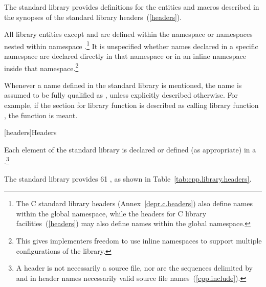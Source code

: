 \pnum
The \Cpp standard library provides definitions
for the entities and macros described in the synopses
of the \Cpp standard library headers~(\ref{headers}).

\pnum
All library entities except
and
are defined within the namespace
or namespaces nested within namespace
.\footnote{The C standard library headers (Annex~\ref{depr.c.headers}) also define
names within the global namespace, while the \Cpp headers for C library
facilities~(\ref{headers}) may also define names within the global namespace.}%
It is unspecified whether names declared in a specific namespace are declared
directly in that namespace or in an inline namespace inside that
namespace.\footnote{This gives implementers freedom to use inline namespaces to
support multiple configurations of the library.}

\pnum
Whenever a name  defined in the standard library is mentioned,
the name  is assumed to be fully qualified as
,
unless explicitly described otherwise. For example, if the \effects section
for library function  is described as calling library function ,
the function
is meant.

[headers]{Headers}

\pnum
Each element of the \Cpp standard library is declared or defined (as appropriate) in a
.\footnote{A header is not necessarily a source file, nor are the
sequences delimited by \tcode{<} and \tcode{>} in header names necessarily valid source
file names~(\ref{cpp.include}).}

\pnum
The \Cpp standard library provides
61
,
%
as shown in Table~\ref{tab:cpp.library.headers}.

